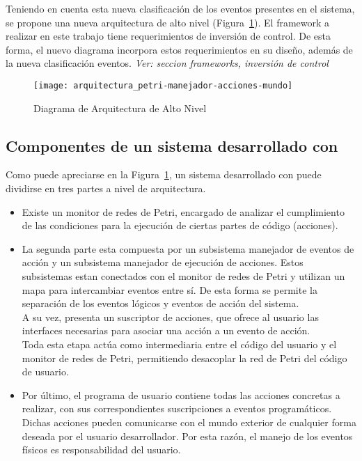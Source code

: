 Teniendo en cuenta esta nueva clasificación de los eventos presentes en el
sistema, se propone una nueva arquitectura de alto nivel
(Figura~\ref{fig:arquitectura_petri-manejador-acciones-mundo}). El framework a
realizar en este trabajo tiene requerimientos de inversión de control. De esta forma, el nuevo diagrama incorpora estos requerimientos en su diseño, además de
la nueva clasificación eventos.\emph{\color{red} Ver: seccion frameworks, inversión de control}

\begin{figure}[h]
	\centering
	\texttt{[image: arquitectura\_petri-manejador-acciones-mundo]}
	\caption{Diagrama de Arquitectura de Alto Nivel}
	\label{fig:arquitectura_petri-manejador-acciones-mundo}
\end{figure}

\subsection{Componentes de un sistema desarrollado con \nombreFramework}
Como puede apreciarse en la
Figura~\ref{fig:arquitectura_petri-manejador-acciones-mundo}, un sistema
desarrollado con \nombreFramework puede dividirse en tres partes a nivel de arquitectura.
\begin{itemize}
\item Existe un monitor de redes de Petri, encargado de analizar el
cumplimiento de las condiciones para la ejecución de ciertas partes de código
(acciones). 
\item La segunda parte esta compuesta por un subsistema manejador de eventos de
acción y un subsistema manejador de ejecución de acciones. Estos subsistemas
estan conectados con el monitor de redes de Petri y utilizan un mapa para 
intercambiar eventos entre sí. De esta forma se permite la separación de los
eventos lógicos y eventos de acción del sistema.\\
A su vez, presenta un suscriptor de acciones, que ofrece al usuario las
interfaces necesarias para asociar una acción a un evento de acción.\\
Toda esta etapa actúa como intermediaria entre el
código del usuario y el monitor de redes de Petri, permitiendo desacoplar la
red de Petri del código de usuario.
\item Por último, el programa de usuario contiene todas las acciones
concretas a realizar, con sus correspondientes suscripciones a eventos
programáticos. Dichas acciones pueden comunicarse con el mundo exterior de
cualquier forma deseada por el usuario desarrollador. Por esta razón, el manejo
de los eventos físicos es responsabilidad del usuario.
\end{itemize}


